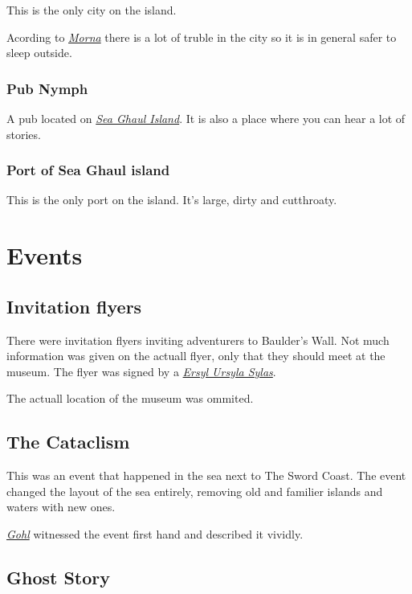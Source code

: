 \documentclass{article}
\begin{document}
\begin{multicols}{2}
    This is the only city on the island.

    Acording to \hyperref[morna]{\textit{Morna}} there is a lot of truble in the city so it is in general safer to sleep outside.

    \subsubsection{Pub Nymph}
    \label{nymph}

    A pub located on \hyperref[sea_ghaul_island]{\textit{Sea Ghaul Island}}. It is also a place where you can hear a lot of stories.

    \subsubsection{Port of Sea Ghaul island}
    \label{port_sea_ghaul}

    This is the only port on the island. It's large, dirty and cutthroaty.

    \section{Events}
    \label{events}

    \subsection{Invitation flyers}
    \label{invitation}

    There were invitation flyers inviting adventurers to Baulder's Wall. Not much information was given on the actuall flyer, only that they should meet at the museum. The flyer was signed by a
    \hyperref[ersyl]{\textit{Ersyl Ursyla Sylas}}.

    The actuall location of the museum was ommited.

    \subsection{The Cataclism}
    \label{cataclism}

    This was an event that happened in the sea next to The Sword Coast. The event changed the layout of the sea entirely, removing old and familier islands and waters with new ones.

    \hyperref[gohl]{\textit{Gohl}} witnessed the event first hand and described it vividly.

    \subsection{Ghost Story}
    \label{ghost_story}


\end{multicols}
\end{document}
